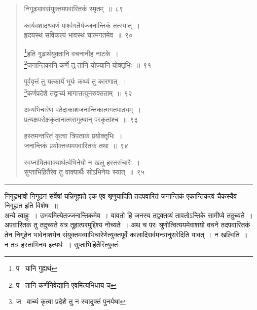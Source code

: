 \documentclass[11pt, openany]{book}
\begin{document}
\begin{quote}
{\na निगूढभावसंयुक्तमपवारितकं स्मृतम्~॥~८९

कार्यवशादश्रवणं पार्श्वगतैर्यज्जनान्तिकं तत्स्यात्~।\\
हृदयस्थं सविकल्पं भावस्थं चात्मगतमेव~॥~९०

\renewcommand{\thefootnote}{1}\footnote{प \textendash\  यानि गुह्यर्थ}इति गुढार्थयुक्तानि वचनानीह नाटके~।\\
\renewcommand{\thefootnote}{2}\footnote{प \textendash\  तानि कर्णनिवेद्यानि एवमित्यभिधाय च}जनान्तिकानि कर्णे तु तानि योज्यानि योक्तृभिः~॥~९१

पूर्ववृत्तं तु यत्कार्यं भूयंः कथ्यं तु कारणात्~।\\
\renewcommand{\thefootnote}{3}\footnote{ज \textendash\  वाच्यं कृत्वा प्रदेशे तु न स्यादुक्तं पुनर्यथा}कर्णप्रदेशे तद्वाच्यं मागात्तत्पुनरुक्तताम्~॥~९२

अव्यभिचारेण पठेदाकाशजनान्तिकात्मगतपाठ्यम्~।\\
प्रत्यक्षपरोक्षकृतानात्मसमुत्थान् परकृतांश्च~॥~९३

हस्तमन्तरितं कृत्वा त्रिपताकं प्रयोक्तृभिः~।\\
जनान्तिकं प्रयोक्तव्यमपवारितकं तथा~॥~९४

स्वप्नायितवाक्यार्थर्त्वभिनेयो न खलु हस्तसंचारैः~।\\
सुप्ताभिहितैरेव तु वाक्यार्थैः सोऽभिनेयः स्यात्~॥~९५}
\end{quote}

\hrule

\vspace{2mm}
\noindent
निगूढभावो निगूढनं सर्वेषां यन्निगूह्यते एक एव श्रृणुयादिति तदपवारितं जनान्तिकं एकान्तिकत्वं चैकस्यैव निगूह्यत इति विशेषः~॥\\

अन्ये त्वाहुः~। उभयमित्येतज्जनान्तिकमेव~। यावतो हि जनस्य तद्वक्तव्यं तावतोऽन्तिके सामीप्ये तदुच्यते~। अपवारितकं तु तदुच्यते यत्र तूहात्परमुद्दिश्य नोच्यते~। अथ च परः श्रुणोत्वित्ययमेवाशयो वचने तदपवारितकं तेन निगूढेन भावेनाशयेन संयुक्तमव्याभिचारेणेत्युक्तपूर्वे कालादिसर्वमन्त्रानुसरेदिति यावत्~। न खल्विति~। न तत्र हस्ताभिनय इत्यर्थः~। सुप्ताभिहितैरित्युक्तं


\newpage
\lfoot{}
\end{document}
